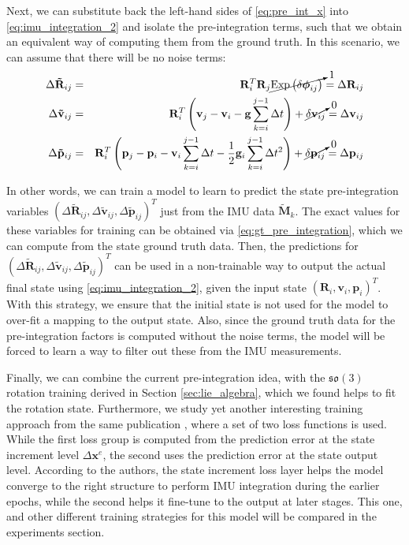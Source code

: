 Next, we can substitute back the left-hand sides of \ref{eq:pre_int_x} into \ref{eq:imu_integration_2} and isolate the pre-integration terms, such that we obtain an equivalent way of computing them from the ground truth.
In this scenario, we can assume that there will be no noise terms:
\begin{eqnarray}\label{eq:gt_pre_integration}
    \Delta\mathbf{\tilde{R}}_{ij} & = & \mathbf{R}_i^T\mathbf{R}_j\cancelto{1}{\textrm{Exp}\left(\delta\boldsymbol{\phi}_{ij}\right)} = \Delta\mathbf{R}_{ij}\nonumber\\
    \Delta\mathbf{\tilde{v}}_{ij} & = & \mathbf{R}_i^T\left(\mathbf{v}_j - \mathbf{v}_i - \mathbf{g}\sum_{k=i}^{j-1}\Delta t\right) + \cancelto{0}{\delta\mathbf{v}_{ij}}= \Delta\mathbf{v}_{ij}\\
    \Delta\mathbf{\tilde{p}}_{ij} & = & \mathbf{R}_i^T\left(\mathbf{p}_j - \mathbf{p}_i - \mathbf{v}_i\sum_{k=i}^{j-1}\Delta t - \frac{1}{2}\mathbf{g}_i\sum_{k=i}^{j-1}\Delta t^2\right) + \cancelto{0}{\delta\mathbf{p}_{ij}}= \Delta\mathbf{p}_{ij}\nonumber
\end{eqnarray}

In other words, we can train a model to learn to predict the state pre-integration variables $(\Delta\mathbf{\tilde{R}}_{ij},\Delta\mathbf{\tilde{v}}_{ij},\Delta\mathbf{\tilde{p}}_{ij})^T$ just from the IMU data $\mathbf{\tilde{M}}_k$.
The exact values for these variables for training can be obtained via \ref{eq:gt_pre_integration},
which we can compute from the state ground truth data.
Then, the predictions for $(\Delta\mathbf{\tilde{R}}_{ij},\Delta\mathbf{\tilde{v}}_{ij},\Delta\mathbf{\tilde{p}}_{ij})^T$ can be used in a non-trainable way to output the actual final state using \ref{eq:imu_integration_2}, given the input state $(\mathbf{R}_i, \mathbf{v}_i, \mathbf{p}_i)^T$.
With this strategy, we ensure that the initial state is not used for the model to over-fit a mapping to the output state.
Also, since the ground truth data for the pre-integration factors is computed without the noise terms, the model will be forced to learn a way to filter out these from the IMU measurements.

Finally, we can combine the current pre-integration idea, with the $\mathfrak{so}(3)$ rotation training derived in Section \ref{sec:lie_algebra}, which we found helps to fit the rotation state. 
Furthermore, we study yet another interesting training approach from the same publication \cite{DBLP:journals/corr/ClarkWWMT17}, where a set of two loss functions is used.
While the first loss group is computed from the prediction error at the state increment level $\Delta \mathbf{x}^e$, the second uses the prediction error at the state output level.
According to the authors, the state increment loss layer helps the model converge to the right structure to perform IMU integration during the earlier epochs, while the second helps it fine-tune to the output at later stages. 
This one, and other different training strategies for this model will be compared in the experiments section.

